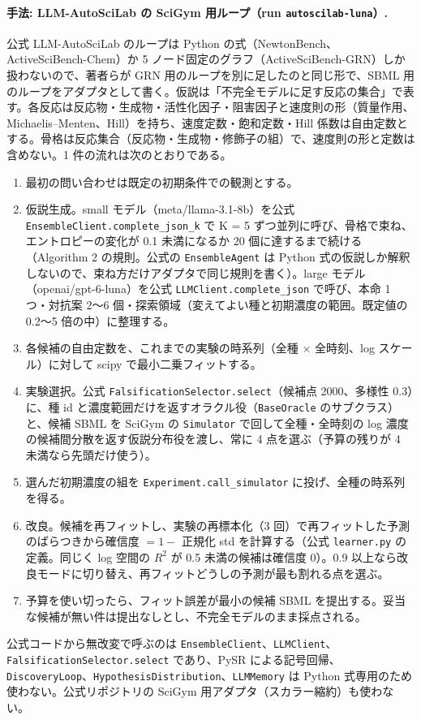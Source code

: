 \documentclass{article}
\begin{document}
\paragraph{手法: LLM-AutoSciLab の SciGym 用ループ（run \texttt{autoscilab-luna}）.}
公式 LLM-AutoSciLab のループは Python の式（NewtonBench、ActiveSciBench-Chem）か 5 ノード固定のグラフ（ActiveSciBench-GRN）しか扱わないので、著者らが GRN 用のループを別に足したのと同じ形で、SBML 用のループをアダプタとして書く。仮説は「不完全モデルに足す反応の集合」で表す。各反応は反応物・生成物・活性化因子・阻害因子と速度則の形（質量作用、Michaelis--Menten、Hill）を持ち、速度定数・飽和定数・Hill 係数は自由定数とする。骨格は反応集合（反応物・生成物・修飾子の組）で、速度則の形と定数は含めない。1 件の流れは次のとおりである。
\begin{enumerate}
\item 最初の問い合わせは既定の初期条件での観測とする。
\item 仮説生成。small モデル（meta/llama-3.1-8b）を公式 \texttt{EnsembleClient.complete\_json\_k} で K = 5 ずつ並列に呼び、骨格で束ね、エントロピーの変化が 0.1 未満になるか 20 個に達するまで続ける（Algorithm 2 の規則。公式の \texttt{EnsembleAgent} は Python 式の仮説しか解釈しないので、束ね方だけアダプタで同じ規則を書く）。large モデル（openai/gpt-6-luna）を公式 \texttt{LLMClient.complete\_json} で呼び、本命 1 つ・対抗案 2〜6 個・探索領域（変えてよい種と初期濃度の範囲。既定値の 0.2〜5 倍の中）に整理する。
\item 各候補の自由定数を、これまでの実験の時系列（全種 × 全時刻、log スケール）に対して scipy で最小二乗フィットする。
\item 実験選択。公式 \texttt{FalsificationSelector.select}（候補点 2000、多様性 0.3）に、種 id と濃度範囲だけを返すオラクル役（\texttt{BaseOracle} のサブクラス）と、候補 SBML を SciGym の \texttt{Simulator} で回して全種・全時刻の log 濃度の候補間分散を返す仮説分布役を渡し、常に 4 点を選ぶ（予算の残りが 4 未満なら先頭だけ使う）。
\item 選んだ初期濃度の組を \texttt{Experiment.call\_simulator} に投げ、全種の時系列を得る。
\item 改良。候補を再フィットし、実験の再標本化（3 回）で再フィットした予測のばらつきから確信度 $= 1 - $ 正規化 std を計算する（公式 \texttt{learner.py} の定義。同じく log 空間の $R^2$ が 0.5 未満の候補は確信度 0）。0.9 以上なら改良モードに切り替え、再フィットどうしの予測が最も割れる点を選ぶ。
\item 予算を使い切ったら、フィット誤差が最小の候補 SBML を提出する。妥当な候補が無い件は提出なしとし、不完全モデルのまま採点される。
\end{enumerate}
公式コードから無改変で呼ぶのは \texttt{EnsembleClient}、\texttt{LLMClient}、\texttt{FalsificationSelector.select} であり、PySR による記号回帰、\texttt{DiscoveryLoop}、\texttt{HypothesisDistribution}、\texttt{LLMMemory} は Python 式専用のため使わない。公式リポジトリの SciGym 用アダプタ（スカラー縮約）も使わない。
\end{document}
